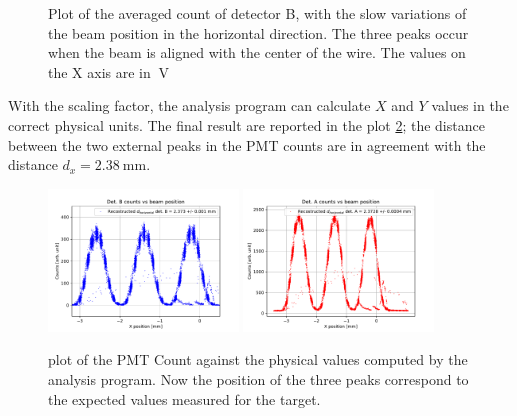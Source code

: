 \begin{figure}[hbtp]
\centering
{}
\caption{Plot of the averaged count of detector B, with the slow variations of the beam position in the horizontal direction. The three peaks occur when the beam is aligned with the center of the wire. The values on the X axis are in $\SI{}{\volt}$}
\label{fig:HorizontalCalibration}
\end{figure}

With the scaling factor, the analysis program can calculate $X$ and $Y$ values in the correct physical units. The final result are reported in the plot \ref{fig:CheckHori}; the distance between the two external peaks in the PMT counts are in agreement with the distance $d_{x}  = \SI{2.38}{\milli \meter}$.
 
\begin{figure}[hbtp]
\centering
\includegraphics[width=0.45\textwidth]{Analysis/XcheckB.pdf} 
\includegraphics[width=0.45\textwidth]{Analysis/XcheckA.pdf}
\caption{plot of the PMT Count against the physical values computed by the analysis program. Now the position of the three peaks correspond to the expected values measured for the target.}
\label{fig:CheckHori}
\end{figure}

